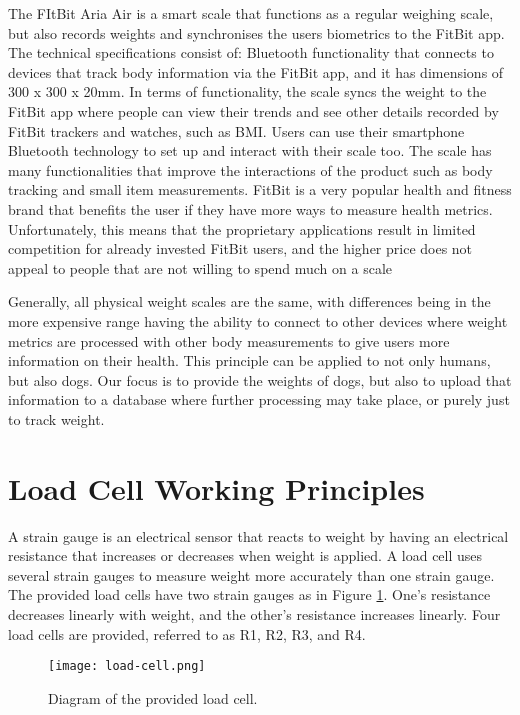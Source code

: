 The FItBit Aria Air is a smart scale that functions as a regular weighing scale, but also records weights and synchronises the users biometrics to the FitBit app. The technical specifications consist of: Bluetooth functionality that connects to devices that track body information via the FitBit app, and it has dimensions of 300 x 300 x 20mm. In terms of functionality, the scale syncs the weight to the FitBit app where people can view their trends and see other details recorded by FitBit trackers and watches, such as BMI. Users can use their smartphone Bluetooth technology to set up and interact with their scale too. The scale has many functionalities that improve the interactions of the product such as body tracking and small item measurements. FitBit is a very popular health and fitness brand that benefits the user if they have more ways to measure health metrics. Unfortunately, this means that the proprietary applications result in limited competition for already invested FitBit users, and the higher price does not appeal to people that are not willing to spend much on a scale

Generally, all physical weight scales are the same, with differences being in the more expensive range having the ability to connect to other devices where weight metrics are processed with other body measurements to give users more information on their health. This principle can be applied to not only humans, but also dogs. Our focus is to provide the weights of dogs, but also to upload that information to a database where further processing may take place, or purely just to track weight.


\section{Load Cell Working Principles}

A strain gauge is an electrical sensor that reacts to weight by having an electrical resistance that increases or decreases when weight is applied. A load cell uses several strain gauges to measure weight more accurately than one strain gauge. The provided load cells have two strain gauges as in Figure \ref{fig:load_cell}. One’s resistance decreases linearly with weight, and the other’s resistance increases linearly. Four load cells are provided, referred to as R1, R2, R3, and R4.



\begin{figure}[!ht]
	\centering
	\texttt{[image: load-cell.png]}
	\caption{Diagram of the provided load cell.}
	\label{fig:load_cell}
\end{figure}


